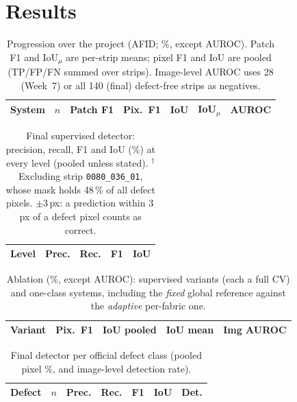 \documentclass[conference]{IEEEtran}
\begin{document}
\section{Results}
\begin{table}[!t]
\centering
\caption{Progression over the project (AFID; \%, except AUROC). Patch F1 and IoU$_\mu$ are per-strip means; pixel F1 and IoU are pooled (TP/FP/FN summed over strips). Image-level AUROC uses 28 (Week~7) or all 140 (final) defect-free strips as negatives.}
\label{tab:progress}
\scriptsize
\setlength{\tabcolsep}{1.6pt}
\begin{tabular}{@{}lrrrrrr@{}}
\toprule
\textbf{System} & $n$ & \textbf{Patch F1} & \textbf{Pix.\ F1} & \textbf{IoU} & \textbf{IoU$_\mu$} & \textbf{AUROC} \\
\midrule

\end{tabular}
\end{table}

\begin{table}[!t]
\centering
\caption{Final supervised detector: precision, recall, F1 and IoU (\%) at every level (pooled unless stated). $^\dagger$Excluding strip \texttt{0080\_036\_01}, whose mask holds 48\,\% of all defect pixels. $\pm3$\,px: a prediction within 3\,px of a defect pixel counts as correct.}
\label{tab:levels}
\scriptsize
\begin{tabular}{@{}lrrrr@{}}
\toprule
\textbf{Level} & \textbf{Prec.} & \textbf{Rec.} & \textbf{F1} & \textbf{IoU} \\
\midrule

\end{tabular}
\end{table}

\begin{table}[!t]
\centering
\caption{Ablation (\%, except AUROC): supervised variants (each a full CV) and one-class systems, including the \emph{fixed} global reference against the \emph{adaptive} per-fabric one.}
\label{tab:ablation}
\scriptsize
\setlength{\tabcolsep}{2.5pt}
\begin{tabular}{@{}>{\raggedright\arraybackslash}p{3.1cm}rrrr@{}}
\toprule
\textbf{Variant} & \textbf{Pix.\ F1} & \textbf{IoU pooled} & \textbf{IoU mean} & \textbf{Img AUROC} \\
\midrule

\end{tabular}
\end{table}

\begin{table}[!t]
\centering
\caption{Final detector per official defect class (pooled pixel \%, and image-level detection rate).}
\label{tab:defect}
\scriptsize
\setlength{\tabcolsep}{2.5pt}
\begin{tabular}{@{}lrrrrrr@{}}
\toprule
\textbf{Defect} & $n$ & \textbf{Prec.} & \textbf{Rec.} & \textbf{F1} & \textbf{IoU} & \textbf{Det.} \\
\midrule

\end{tabular}
\end{table}
\end{document}
